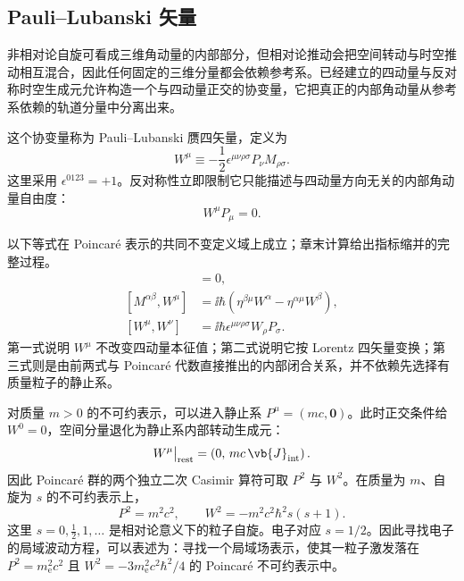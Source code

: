 \subsection{Pauli--Lubanski 矢量}

非相对论自旋可看成三维角动量的内部部分，但相对论推动会把空间转动与时空推动相互混合，因此任何固定的三维分量都会依赖参考系。已经建立的四动量与反对称时空生成元允许构造一个与四动量正交的协变量，它把真正的内部角动量从参考系依赖的轨道分量中分离出来。

\begin{definition}
这个协变量称为 Pauli--Lubanski 赝四矢量，定义为
\begin{equation}
 {
 W^\mu\equiv-\frac12\epsilon^{\mu\nu\rho\sigma}
 P_\nu M_{\rho\sigma}.}
 \label{eq:pauli-lubanski}
\end{equation}
这里采用 $\epsilon^{0123}=+1$。反对称性立即限制它只能描述与四动量方向无关的内部角动量自由度：
\begin{equation}
 W^\mu P_\mu=0.
 \label{eq:W-orthogonality-dp34}
\end{equation}

\end{definition}

\begin{proposition}
以下等式在 Poincar\'e 表示的共同不变定义域上成立；章末计算给出指标缩并的完整过程。
\begin{align}
 [W^\mu,P^\lambda]&=0,
 \label{eq:w-p}\\
 [M^{\alpha\beta},W^\mu]
 &=\ii\hbar\left(
 \eta^{\beta\mu}W^\alpha-
 \eta^{\alpha\mu}W^\beta\right),
 \label{eq:m-w}\\
 [W^\mu,W^\nu]
 &=\ii\hbar\epsilon^{\mu\nu\rho\sigma}W_\rho P_\sigma.
 \label{eq:w-w-dp34}
\end{align}
第一式说明 $W^\mu$ 不改变四动量本征值；第二式说明它按 Lorentz 四矢量变换；第三式则是由前两式与 Poincar\'e 代数直接推出的内部闭合关系，并不依赖先选择有质量粒子的静止系。

\end{proposition}

\begin{proposition}
对质量 $m>0$ 的不可约表示，可以进入静止系
$P^\mu=(mc,\mathbf0)$。此时正交条件给 $W^0=0$，空间分量退化为静止系内部转动生成元：
\begin{equation}
 {
 W^\mu\big|_{\rm rest}
 =\left(0,\,mc\,\vb{J}_{\rm int}\right).}
 \label{eq:W-rest-r13}
\end{equation}
因此 Poincar\'e 群的两个独立二次 Casimir 算符可取 $P^2$ 与 $W^2$。在质量为 $m$、自旋为 $s$ 的不可约表示上，
\begin{equation}
 {
 P^2=m^2c^2,
 \qquad
 W^2=-m^2c^2\hbar^2s(s+1).}
 \label{eq:poincare-casimirs}
\end{equation}
这里 $s=0,\frac12,1,\ldots$ 是相对论意义下的粒子自旋。电子对应 $s=1/2$。因此寻找电子的局域波动方程，可以表述为：寻找一个局域场表示，使其一粒子激发落在 $P^2=m_{\mathrm e}^2c^2$ 且 $W^2=-3m_{\mathrm e}^2c^2\hbar^2/4$ 的 Poincar\'e 不可约表示中。

\end{proposition}

